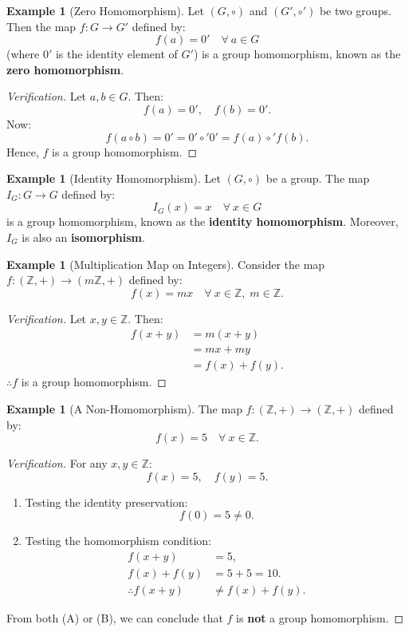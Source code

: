 \documentclass[12pt]{article}
\theoremstyle{definition}
\newtheorem{example}[definition]{Example}
\theoremstyle{plain}
\begin{document}
\begin{example}[Zero Homomorphism]
Let $(G, \circ)$ and $(G', \circ')$ be two groups. Then the map $f: G \longrightarrow G'$ defined by:
\[
f(a) = 0' \quad \forall\ a \in G
\]
(where $0'$ is the identity element of $G'$) is a group homomorphism, known as the \textbf{zero homomorphism}.

\begin{proof}[Verification]
Let $a, b \in G$. Then:
\[
f(a) = 0', \quad f(b) = 0'.
\]
Now:
\[
f(a \circ b) = 0' = 0' \circ' 0' = f(a) \circ' f(b).
\]
Hence, $f$ is a group homomorphism.
\end{proof}
\end{example}

\begin{example}[Identity Homomorphism]
Let $(G, \circ)$ be a group. The map $I_G: G \longrightarrow G$ defined by:
\[
I_G(x) = x \quad \forall\ x \in G
\]
is a group homomorphism, known as the \textbf{identity homomorphism}.
Moreover, $I_G$ is also an \textbf{isomorphism}.
\end{example}

\begin{example}[Multiplication Map on Integers]
Consider the map $f: (\mathbb{Z}, +) \longrightarrow (m\mathbb{Z}, +)$ defined by:
\[
f(x) = mx \quad \forall\ x \in \mathbb{Z}, \; m \in \mathbb{Z}.
\]
\begin{proof}[Verification]
Let $x, y \in \mathbb{Z}$. Then:
\begin{align*}
f(x + y) &= m(x + y) \\
&= mx + my \\
&= f(x) + f(y).
\end{align*}
$\therefore f$ is a group homomorphism.
\end{proof}
\end{example}

\begin{example}[A Non-Homomorphism]
The map $f: (\mathbb{Z}, +) \longrightarrow (\mathbb{Z}, +)$ defined by:
\[
f(x) = 5 \quad \forall\ x \in \mathbb{Z}.
\]
\begin{proof}[Verification]
For any $x, y \in \mathbb{Z}$:
\[
f(x) = 5, \quad f(y) = 5.
\]
\begin{enumerate}[label=(\Alph*)]
    \item Testing the identity preservation:
    \[
    f(0) = 5 \neq 0. \tag{A}
    \]
    \item Testing the homomorphism condition:
    \begin{align*}
        f(x + y) &= 5, \\
        f(x) + f(y) &= 5 + 5 = 10. \\
        \therefore f(x + y) &\neq f(x) + f(y). \tag{B}
    \end{align*}
\end{enumerate}
From both (A) or (B), we can conclude that $f$ is \textbf{not} a group homomorphism.
\end{proof}
\end{example}
\end{document}
